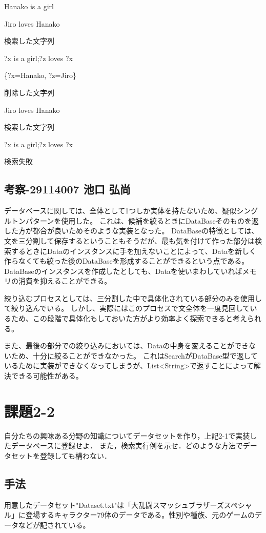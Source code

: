 \documentclass{jarticle}
\begin{document}
Hanako is a girl

Jiro loves Hanako


検索した文字列

?x is a girl;?z loves ?x

\{?x=Hanako, ?z=Jiro\}


削除した文字列

Jiro loves Hanako

検索した文字列

?x is a girl;?z loves ?x

検索失敗
\subsection{考察-29114007 池口 弘尚}
データベースに関しては、全体として1つしか実体を持たないため、疑似シングルトンパターンを使用した。
これは、候補を絞るときにDataBaseそのものを返した方が都合が良いためそのような実装となった。
DataBaseの特徴としては、文を三分割して保存するということもそうだが、最も気を付けて作った部分は検索するときにDataのインスタンスに手を加えないことによって、Dataを新しく作らなくても絞った後のDataBaseを形成することができるという点である。
DataBaseのインスタンスを作成したとしても、Dataを使いまわしていればメモリの消費を抑えることができる。

絞り込むプロセスとしては、三分割した中で具体化されている部分のみを使用して絞り込んでいる。
しかし、実際にはこのプロセスで文全体を一度見回しているため、この段階で具体化もしておいた方がより効率よく探索できると考えられる。

また、最後の部分での絞り込みにおいては、Dataの中身を変えることができないため、十分に絞ることができなかった。
これはSearchがDataBase型で返しているために実装ができなくなってしまうが、List<String>で返すことによって解決できる可能性がある。


\section{課題2-2}
\begin{screen}
    自分たちの興味ある分野の知識についてデータセットを作り，上記2-1で実装したデータベースに登録せよ．
    また，検索実行例を示せ．どのような方法でデータセットを登録しても構わない．
\end{screen}

\subsection{手法}
用意したデータセット"Dataset.txt"は「大乱闘スマッシュブラザーズスペシャル」に登場するキャラクター79体のデータである。性別や種族、元のゲームのデータなどが記されている。
\end{document}
